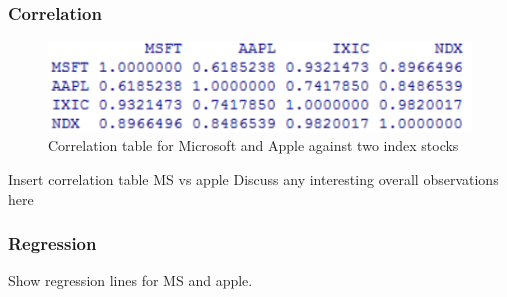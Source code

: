 \documentclass[paper=a4, fontsize=11pt]{scrartcl} %
\numberwithin{equation}{section} %
\numberwithin{figure}{section} %
\numberwithin{table}{section} %
\begin{document}
\subsubsection{Correlation}

\begin{figure}[!htb]
  \includegraphics[width=\linewidth]{graph/cor3.png}
  \caption{Correlation table for Microsoft and Apple against two index stocks}
\endminipage\hfill
\end{figure}

Insert correlation table MS vs apple
Discuss any interesting overall observations here

\subsubsection{Regression}
Show regression lines for MS and apple. 
\end{document}
